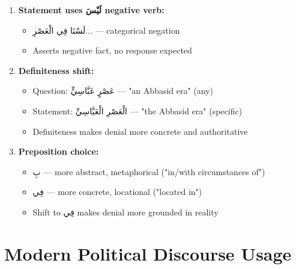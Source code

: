 \documentclass[letterpaper,12pt]{article}
\begin{document}
\begin{tcolorbox}[colback=white,colframe=accentcolor,breakable]
\begin{enumerate}
\item \textbf{Statement uses \textarabic{لَيْسَ} negative verb:}
\begin{itemize}
\item \textarabic{لَسْنَا فِي الْعَصْرِ...} — categorical negation
\item Asserts negative fact, no response expected
\end{itemize}

\item \textbf{Definiteness shift:}
\begin{itemize}
\item Question: \textarabic{عَصْرٍ عَبَّاسِيٍّ} — "an Abbasid era" (any)
\item Statement: \textarabic{الْعَصْرِ الْعَبَّاسِيِّ} — "the Abbasid era" (specific)
\item Definiteness makes denial more concrete and authoritative
\end{itemize}

\item \textbf{Preposition choice:}
\begin{itemize}
\item \textarabic{بِ} — more abstract, metaphorical ("in/with circumstances of")
\item \textarabic{فِي} — more concrete, locational ("located in")
\item Shift to \textarabic{فِي} makes denial more grounded in reality
\end{itemize}
\end{enumerate}
\end{tcolorbox}

\section{Modern Political Discourse Usage}
\end{document}
